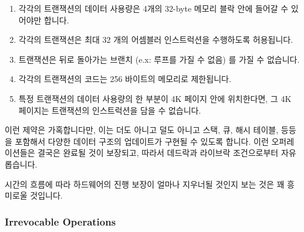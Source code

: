 \begin{enumerate}
\item	각각의 트랜잭션의 데이터 사용량은 4개의 32-byte 메모리 블락 안에 들어갈
	수 있어야만 합니다.
\item	각각의 트랜잭션은 최대 32 개의 어셈블러 인스트럭션을 수행하도록
	허용됩니다.
\item	트랜잭션은 뒤로 돌아가는 브랜치 (e.x: 루프를 가질 수 없음) 를 가질 수
	없습니다.
\item	각각의 트랜잭션의 코드는 256 바이트의 메모리로 제한됩니다.
\item	특정 트랜잭션의 데이터 사용량의 한 부분이 4K 페이지 안에 위치한다면, 그
	4K 페이지는 트랜잭션의 인스트럭션을 담을 수 없습니다.
\iffalse

\item	Each transaction's data footprint must be contained within
	four 32-byte blocks of memory.
\item	Each transaction is permitted to execute at most 32 assembler
	instructions.
\item	Transactions are not permitted to have backwards branches
	(e.g., no loops).
\item	Each transaction's code is limited to 256 bytes of memory.
\item	If a portion of a given transaction's data footprint resides
	within a given 4K page, then that 4K page is prohibited from
	containing any of that transaction's instructions.
\fi
\end{enumerate}

이런 제약은 가혹합니다만, 이는 더도 아니고 덜도 아니고 스택, 큐, 해시 테이블,
등등을 포함해서 다양한 데이터 구조의 업데이트가 구현될 수 있도록 합니다.
이런 오퍼레이션들은 결국은 완료될 것이 보장되고, 따라서 데드락과 라이브락
조건으로부터 자유롭습니다.

시간의 흐름에 따라 하드웨어의 진행 보장이 얼마나 지우너될 것인지 보는 것은 꽤
흥미로울 것입니다.
\iffalse

These constraints are severe, but they nevertheless permit a wide variety
of data-structure updates to be implemented, including stacks, queues,
hash tables, and so on.
These operations are guaranteed to eventually complete, and are free of
deadlock and livelock conditions.

It will be interesting to see how hardware support of forward-progress
guarantees evolves over time.
\fi

\subsubsection{Irrevocable Operations}
\label{sec:future:Irrevocable Operations}

